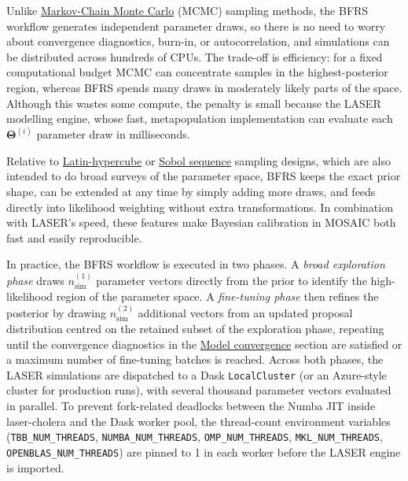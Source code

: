\documentclass[
]{book}
\begin{document}
Unlike \href{https://en.wikipedia.org/wiki/Markov_chain_Monte_Carlo}{Markov-Chain Monte Carlo} (MCMC) sampling methods, the BFRS workflow generates independent parameter draws, so there is no need to worry about convergence diagnostics, burn-in, or autocorrelation, and simulations can be distributed across hundreds of CPUs. The trade-off is efficiency: for a fixed computational budget MCMC can concentrate samples in the highest-posterior region, whereas BFRS spends many draws in moderately likely parts of the space. Although this wastes some compute, the penalty is small because the LASER modelling engine, whose fast, metapopulation implementation can evaluate each \(\boldsymbol{\Theta}^{(i)}\) parameter draw in milliseconds.

Relative to \href{https://en.wikipedia.org/wiki/Latin_hypercube_sampling\#:~:text=Thus\%2C\%20orthogonal\%20sampling\%20ensures\%20that,of\%20random\%20numbers\%20without\%20any}{Latin-hypercube} or \href{https://en.wikipedia.org/wiki/Sobol_sequence}{Sobol sequence} sampling designs, which are also intended to do broad surveys of the parameter space, BFRS keeps the exact prior shape, can be extended at any time by simply adding more draws, and feeds directly into likelihood weighting without extra transformations. In combination with LASER's speed, these features make Bayesian calibration in MOSAIC both fast and easily reproducible.

In practice, the BFRS workflow is executed in two phases. A \emph{broad exploration phase} draws \(n_{\text{sim}}^{(1)}\) parameter vectors directly from the prior to identify the high-likelihood region of the parameter space. A \emph{fine-tuning phase} then refines the posterior by drawing \(n_{\text{sim}}^{(2)}\) additional vectors from an updated proposal distribution centred on the retained subset of the exploration phase, repeating until the convergence diagnostics in the \hyperref[model-convergence]{Model convergence} section are satisfied or a maximum number of fine-tuning batches is reached. Across both phases, the LASER simulations are dispatched to a Dask \texttt{LocalCluster} (or an Azure-style cluster for production runs), with several thousand parameter vectors evaluated in parallel. To prevent fork-related deadlocks between the Numba JIT inside laser-cholera and the Dask worker pool, the thread-count environment variables (\texttt{TBB\_NUM\_THREADS}, \texttt{NUMBA\_NUM\_THREADS}, \texttt{OMP\_NUM\_THREADS}, \texttt{MKL\_NUM\_THREADS}, \texttt{OPENBLAS\_NUM\_THREADS}) are pinned to 1 in each worker before the LASER engine is imported.
\end{document}

